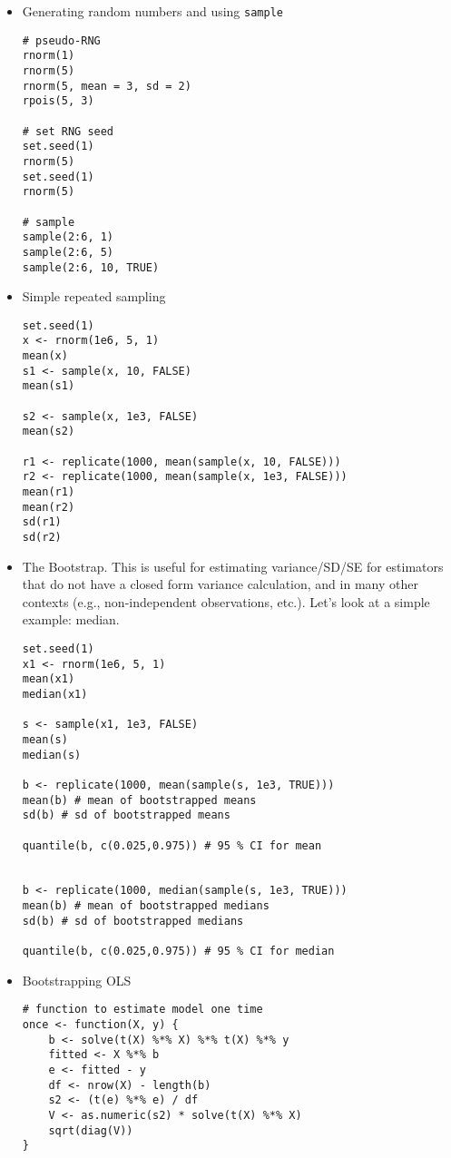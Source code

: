 \documentclass[a4paper,12pt]{article}
\begin{document}
\begin{itemize}

\item Generating random numbers and using \texttt{sample}

\begin{lstlisting}
# pseudo-RNG
rnorm(1)
rnorm(5)
rnorm(5, mean = 3, sd = 2)
rpois(5, 3)

# set RNG seed
set.seed(1)
rnorm(5)
set.seed(1)
rnorm(5)

# sample
sample(2:6, 1)
sample(2:6, 5)
sample(2:6, 10, TRUE)
\end{lstlisting}

\item Simple repeated sampling

\begin{lstlisting}
set.seed(1)
x <- rnorm(1e6, 5, 1)
mean(x)
s1 <- sample(x, 10, FALSE)
mean(s1)

s2 <- sample(x, 1e3, FALSE)
mean(s2)

r1 <- replicate(1000, mean(sample(x, 10, FALSE)))
r2 <- replicate(1000, mean(sample(x, 1e3, FALSE)))
mean(r1)
mean(r2)
sd(r1)
sd(r2)
\end{lstlisting}

\item The Bootstrap. This is useful for estimating variance/SD/SE for estimators that do not have a closed form variance calculation, and in many other contexts (e.g., non-independent observations, etc.). Let's look at a simple example: median.

\begin{lstlisting}
set.seed(1)
x1 <- rnorm(1e6, 5, 1)
mean(x1)
median(x1)

s <- sample(x1, 1e3, FALSE)
mean(s)
median(s)

b <- replicate(1000, mean(sample(s, 1e3, TRUE)))
mean(b) # mean of bootstrapped means
sd(b) # sd of bootstrapped means

quantile(b, c(0.025,0.975)) # 95 % CI for mean


b <- replicate(1000, median(sample(s, 1e3, TRUE)))
mean(b) # mean of bootstrapped medians
sd(b) # sd of bootstrapped medians

quantile(b, c(0.025,0.975)) # 95 % CI for median
\end{lstlisting}



\item Bootstrapping OLS

\begin{lstlisting}
# function to estimate model one time
once <- function(X, y) {
    b <- solve(t(X) %*% X) %*% t(X) %*% y
    fitted <- X %*% b
    e <- fitted - y
    df <- nrow(X) - length(b)
    s2 <- (t(e) %*% e) / df
    V <- as.numeric(s2) * solve(t(X) %*% X)
    sqrt(diag(V))
}


\end{lstlisting}
\end{itemize}
\end{document}
